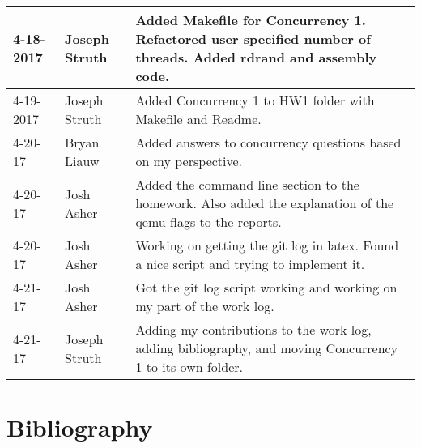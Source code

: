 \documentclass[10pt,draftclsnofoot,onecolumn, compsoc]{IEEEtran}
\begin{document}
\begin{tabular}{| l | l | p{15cm} |}
4-18-2017 & Joseph Struth & Added Makefile for Concurrency 1. Refactored user specified number of threads. Added rdrand and assembly code.\\\hline
4-19-2017 & Joseph Struth & Added Concurrency 1 to HW1 folder with Makefile and Readme.\\\hline
4-20-17 & Bryan Liauw & Added answers to concurrency questions based on my perspective.\\\hline
4-20-17 & Josh Asher & Added the command line section to the homework. Also added the explanation of the qemu flags to the reports.\\\hline
4-20-17 & Josh Asher & Working on getting the git log in latex. Found a nice script and trying to implement it.\\\hline
4-21-17 & Josh Asher & Got the git log script working and working on my part of the work log.\\\hline
4-21-17 & Joseph Struth & Adding my contributions to the work log, adding bibliography, and moving Concurrency 1 to its own folder.\\\hline
\end{tabular}

\section{Bibliography}
\nocite{*}


\end{document}
